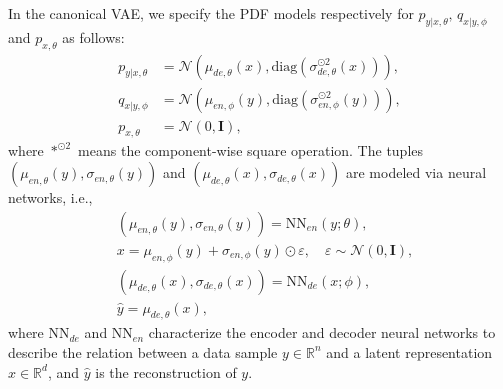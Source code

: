 In the canonical VAE, we specify the PDF models respectively for $p_{y|x,\theta},\,q_{x|y,\phi}$ and $p_{x,\theta}$ as follows:
\begin{equation}
	\begin{aligned}
		p_{y|x,\theta}&=\mathcal{N}\left(\mu_{de,\theta}\left(x\right), \text{diag}\left(\sigma_{de,\theta}^{\odot 2}\left(x\right)\right)\right),\\
		q_{x|y,\phi}&=\mathcal{N}\left(\mu_{en,\phi}\left(y\right), \text{diag}\left(\sigma_{en,\phi}^{\odot 2}\left(y\right)\right)\right), \label{caen}\\
		p_{x,\theta}&=\mathcal{N}(0,\mathbf{I}),
	\end{aligned}
\end{equation}
where ${*}^{\odot2}$ means the component-wise square operation. The tuples $(\mu_{en,\theta}(y), \sigma_{en,\theta}(y))$ and $\left(\mu_{de,\theta}(x), \sigma_{de,\theta}(x)\right)$ are modeled via neural networks, i.e.,
\begin{align}
&\left(\mu_{en,\theta}(y), \sigma_{en,\theta}(y)\right)=\text{NN}_{en}(y;\theta),\label{vae1}\\
&x=\mu_{en,\phi}(y)+\sigma_{en,\phi}(y)\odot \varepsilon,\quad \varepsilon \sim \mathcal{N}(0,\mathbf{I}),\label{vae2}\\
&\left(\mu_{de,\theta}(x), \sigma_{de,\theta}(x)\right)=\text{NN}_{de}(x;\phi),\label{vae3}\\
&\hat{y}=\mu_{de,\theta}(x),
\end{align}
where $\text{NN}_{de}$ and $\text{NN}_{en}$ characterize the encoder and decoder neural networks to describe the relation between a data sample $y\in\mathbb{R}^n$ and a latent representation $x\in\mathbb{R}^d$, and $\hat{y}$ is the reconstruction of  $y$. 

